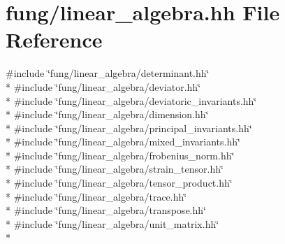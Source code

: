 \hypertarget{linear__algebra_8hh}{\section{fung/linear\-\_\-algebra.hh File Reference}
\label{linear__algebra_8hh}
}
{\ttfamily \#include \char`\"{}fung/linear\-\_\-algebra/determinant.\-hh\char`\"{}}\\*
{\ttfamily \#include \char`\"{}fung/linear\-\_\-algebra/deviator.\-hh\char`\"{}}\\*
{\ttfamily \#include \char`\"{}fung/linear\-\_\-algebra/deviatoric\-\_\-invariants.\-hh\char`\"{}}\\*
{\ttfamily \#include \char`\"{}fung/linear\-\_\-algebra/dimension.\-hh\char`\"{}}\\*
{\ttfamily \#include \char`\"{}fung/linear\-\_\-algebra/principal\-\_\-invariants.\-hh\char`\"{}}\\*
{\ttfamily \#include \char`\"{}fung/linear\-\_\-algebra/mixed\-\_\-invariants.\-hh\char`\"{}}\\*
{\ttfamily \#include \char`\"{}fung/linear\-\_\-algebra/frobenius\-\_\-norm.\-hh\char`\"{}}\\*
{\ttfamily \#include \char`\"{}fung/linear\-\_\-algebra/strain\-\_\-tensor.\-hh\char`\"{}}\\*
{\ttfamily \#include \char`\"{}fung/linear\-\_\-algebra/tensor\-\_\-product.\-hh\char`\"{}}\\*
{\ttfamily \#include \char`\"{}fung/linear\-\_\-algebra/trace.\-hh\char`\"{}}\\*
{\ttfamily \#include \char`\"{}fung/linear\-\_\-algebra/transpose.\-hh\char`\"{}}\\*
{\ttfamily \#include \char`\"{}fung/linear\-\_\-algebra/unit\-\_\-matrix.\-hh\char`\"{}}\\*
